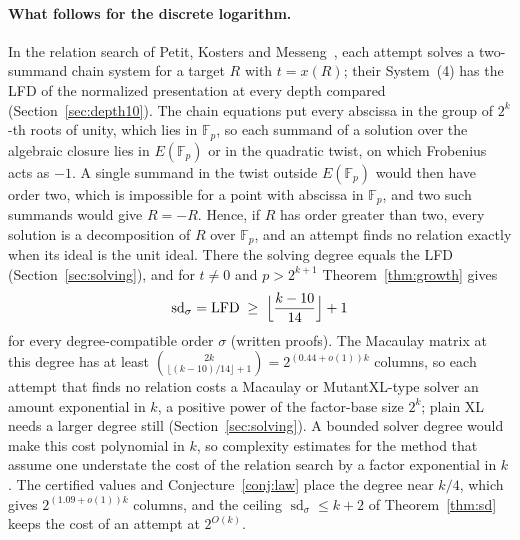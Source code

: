 \documentclass[11pt]{article}
\theoremstyle{definition}\newtheorem{definition}[theorem]{Definition}
\theoremstyle{remark}\newtheorem{remark}[theorem]{Remark}
\newcommand{\F}{\mathbb F}
\newcommand{\lfd}{\operatorname{LFD}}
\newcommand{\sd}{\operatorname{sd}}
\begin{document}
\paragraph{What follows for the discrete logarithm.} In the relation search
of Petit, Kosters and Messeng~\cite{pkm}, each attempt solves a two-summand
chain system for a target $R$ with $t=x(R)$; their System~(4) has the LFD of
the normalized presentation at every depth compared
(Section~\ref{sec:depth10}). The chain equations put every abscissa in the
group of $2^k$-th roots of unity, which lies in $\F_p$, so each summand of a
solution over the algebraic closure lies in $E(\F_p)$ or in the quadratic
twist, on which Frobenius acts as $-1$. A single summand in the twist
outside $E(\F_p)$ would then have order two, which is impossible for a point
with abscissa in $\F_p$, and two such summands would give $R=-R$. Hence, if
$R$ has order greater than two, every solution is a decomposition of $R$
over $\F_p$, and an attempt finds no relation exactly when its ideal is the
unit ideal. There
the solving degree equals the LFD (Section~\ref{sec:solving}), and for
$t\ne0$ and $p>2^{k+1}$ Theorem~\ref{thm:growth} gives
\[
 \sd_\sigma=\lfd\;\ge\;\Bigl\lfloor\frac{k-10}{14}\Bigr\rfloor+1
\]
for every degree-compatible order $\sigma$ (written proofs). The Macaulay
matrix at this degree has at least
$\binom{2k}{\lfloor(k-10)/14\rfloor+1}=2^{(0.44+o(1))k}$ columns, so each
attempt that finds no relation costs a Macaulay or MutantXL-type solver an
amount exponential in $k$, a positive power of the factor-base size $2^k$;
plain XL needs a larger degree still (Section~\ref{sec:solving}). A bounded
solver degree would make this cost polynomial in $k$, so complexity
estimates for the method that assume one understate the cost of the
relation search by a factor exponential in $k$. The certified values and
Conjecture~\ref{conj:law} place the degree near $k/4$, which gives
$2^{(1.09+o(1))k}$ columns, and the ceiling $\sd_\sigma\le k+2$ of
Theorem~\ref{thm:sd} keeps the cost of an attempt at $2^{O(k)}$.
\end{document}
